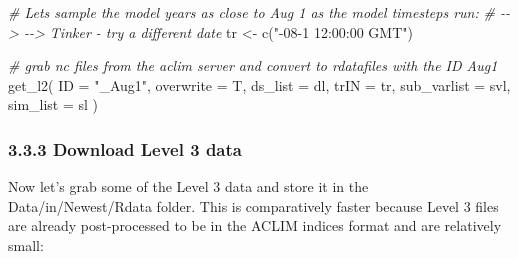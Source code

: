 \documentclass[
]{article}
\newenvironment{Shaded}{\begin{snugshade}}{\end{snugshade}}
\newcommand{\AttributeTok}[1]{\textcolor[rgb]{0.77,0.63,0.00}{#1}}
\newcommand{\CommentTok}[1]{\textcolor[rgb]{0.56,0.35,0.01}{\textit{#1}}}
\newcommand{\FunctionTok}[1]{\textcolor[rgb]{0.00,0.00,0.00}{#1}}
\newcommand{\NormalTok}[1]{#1}
\newcommand{\OtherTok}[1]{\textcolor[rgb]{0.56,0.35,0.01}{#1}}
\newcommand{\StringTok}[1]{\textcolor[rgb]{0.31,0.60,0.02}{#1}}
\begin{document}
\begin{Shaded}
\begin{Highlighting}[]
    
    \CommentTok{\# Let\textquotesingle{}s sample the model years as close to Aug 1 as the model timesteps run:}
    \CommentTok{\# {-}{-}\textgreater{} {-}{-}\textgreater{} Tinker {-} try a different date}
\NormalTok{    tr          }\OtherTok{\textless{}{-}} \FunctionTok{c}\NormalTok{(}\StringTok{"{-}08{-}1 12:00:00 GMT"}\NormalTok{) }
    
    \CommentTok{\# grab nc files from the aclim server and convert to rdatafiles with the ID Aug1}
    \FunctionTok{get\_l2}\NormalTok{(}
      \AttributeTok{ID          =} \StringTok{"\_Aug1"}\NormalTok{,}
      \AttributeTok{overwrite   =}\NormalTok{  T,}
      \AttributeTok{ds\_list     =}\NormalTok{ dl,}
      \AttributeTok{trIN        =}\NormalTok{ tr,}
      \AttributeTok{sub\_varlist =}\NormalTok{ svl,  }
      \AttributeTok{sim\_list    =}\NormalTok{ sl  )}
\end{Highlighting}
\end{Shaded}

\hypertarget{download-level-3-data}{%
\subsubsection{3.3.3 Download Level 3
data}\label{download-level-3-data}}

Now let's grab some of the Level 3 data and store it in the
Data/in/Newest/Rdata folder. This is comparatively faster because Level
3 files are already post-processed to be in the ACLIM indices format and
are relatively small:
\end{document}
